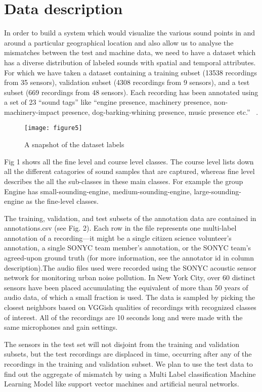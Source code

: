 \section{Data description}
In order to build a system which would visualize the various sound points in and around a particular geographical location and also allow us to analyse the mismatches between the test and machine data, we need to have a dataset which has a diverse distribution of labeled sounds with spatial and temporal attributes. For which we have taken a dataset containing a training subset (13538 recordings from 35 sensors), validation subset (4308 recordings from 9 sensors), and a test subset (669 recordings from 48 sensors). Each recording has been annotated using a set of 23 “sound tags” like “engine presence, machinery presence, non-machinery-impact presence, dog-barking-whining presence, music presence etc.”  ~\cite{4}.

	\begin{figure}[h!]
	\texttt{[image: figure5]}
	\caption{A snapshot of the dataset labels}
\end{figure}

Fig 1 shows all the fine level and course level classes. The course level lists down all the different catagories of  sound samples that are captured, whereas fine level describes the all the sub-classes in these main classes. For example the group Engine has small-sounding-engine, medium-sounding-engine, large-sounding-engine as the fine-level classes.

The training, validation, and test subsets of the annotation data are contained in annotations.csv (see Fig. 2). Each row in the file represents one multi-label annotation of a recording—it might be a single citizen science volunteer's annotation, a single SONYC team member's annotation, or the SONYC team's agreed-upon ground truth (for more information, see the annotator id in column description).The audio files used were recorded using the SONYC acoustic sensor network for monitoring urban noise pollution. In New York City, over 60 distinct sensors have been placed accumulating the equivalent of more than 50 years of audio data, of which a small fraction is used. The data is sampled by picking the closest neighbors based on VGGish qualities of recordings with recognized classes of interest. All of the recordings are 10 seconds long and were made with the same microphones and gain settings. 

The sensors in the test set will not disjoint from the training and validation subsets, but the test recordings are displaced in time, occurring after any of the recordings in the training and validation subset. We plan to use the test data to find out the aggregate of mismatch by using a Multi Label classification Machine Learning Model like support vector machines and artificial neural networks.

